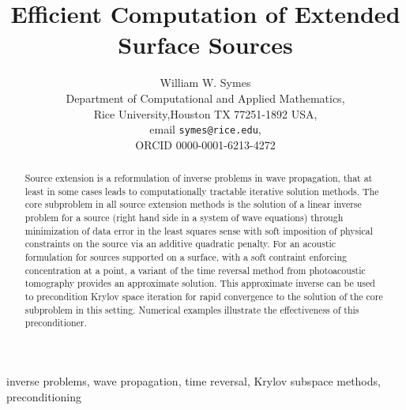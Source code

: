 \documentclass[12pt]{geophysics}
\begin{document}
\title{Efficient Computation of Extended Surface Sources}
\author{William W. Symes\\
  Department of Computational and Applied Mathematics,\\
  Rice University,Houston TX 77251-1892 USA,\\
  email {\tt symes@rice.edu},\\
ORCID 0000-0001-6213-4272}



\maketitle
\begin{abstract}
Source extension is a reformulation of inverse problems in wave
propagation, that at least in some cases leads to computationally
tractable iterative solution methods. The core subproblem in all
source extension methods is the solution of a linear inverse problem
for a source (right hand side in a system of wave equations) through
minimization of data error in the least squares sense with soft
imposition of physical constraints on the source via an additive
quadratic penalty. For an acoustic formulation for sources supported
on a surface, with a soft contraint enforcing concentration at a
point, a variant of the time reversal method from photoacoustic
tomography provides an approximate solution. This approximate inverse
can be used to precondition Krylov space iteration for rapid
convergence to the solution of the core subproblem in this
setting. Numerical examples illustrate the effectiveness of this preconditioner.
\end{abstract}

 inverse problems, wave propagation, time
reversal, Krylov subspace methods, preconditioning

\end{document}
